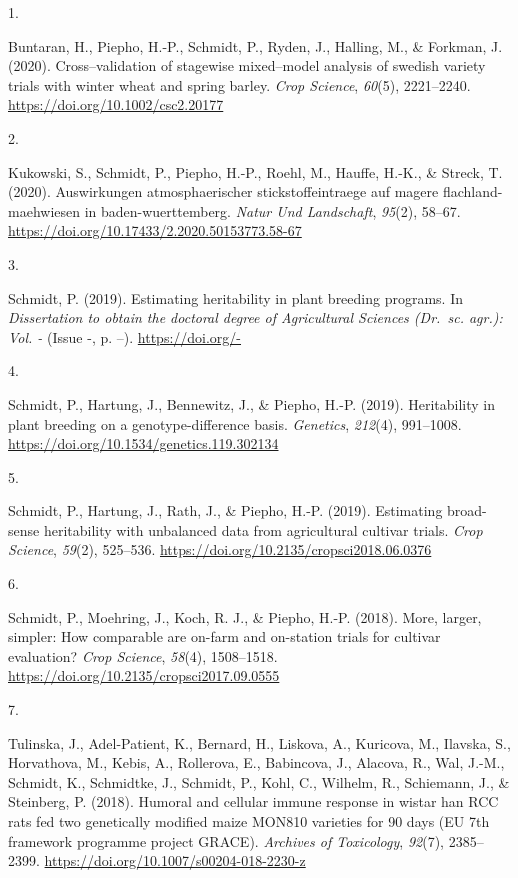\documentclass[11pt, a4paper]{awesome-cv}
\newlength{\csllabelwidth}
\newcommand{\CSLLeftMargin}[1]{\parbox[t]{\csllabelwidth}{#1}}
\newcommand{\CSLRightInline}[1]{\parbox[t]{\linewidth - \csllabelwidth}{#1}}
\begin{document}
\footnotesize

\hypertarget{bibliography}{}
\leavevmode\hypertarget{ref-Buntaran2020}{}%
\CSLLeftMargin{1. }
\CSLRightInline{Buntaran, H., Piepho, H.-P., Schmidt, P., Ryden, J.,
Halling, M., \& Forkman, J. (2020). Cross--validation of stagewise
mixed--model analysis of swedish variety trials with winter wheat and
spring barley. \emph{Crop Science}, \emph{60}(5), 2221--2240.
\url{https://doi.org/10.1002/csc2.20177}}

\leavevmode\hypertarget{ref-Kukowski2020}{}%
\CSLLeftMargin{2. }
\CSLRightInline{Kukowski, S., Schmidt, P., Piepho, H.-P., Roehl, M.,
Hauffe, H.-K., \& Streck, T. (2020). Auswirkungen atmosphaerischer
stickstoffeintraege auf magere flachland-maehwiesen in
baden-wuerttemberg. \emph{Natur Und Landschaft}, \emph{95}(2), 58--67.
\url{https://doi.org/10.17433/2.2020.50153773.58-67}}

\leavevmode\hypertarget{ref-Schmidt2019}{}%
\CSLLeftMargin{3. }
\CSLRightInline{Schmidt, P. (2019). Estimating heritability in plant
breeding programs. In \emph{Dissertation to obtain the doctoral degree
of Agricultural Sciences (Dr.~sc. agr.): Vol. -} (Issue -, p. --).
\url{https://doi.org/-}}

\leavevmode\hypertarget{ref-Schmidt2019b}{}%
\CSLLeftMargin{4. }
\CSLRightInline{Schmidt, P., Hartung, J., Bennewitz, J., \& Piepho,
H.-P. (2019). Heritability in plant breeding on a genotype-difference
basis. \emph{Genetics}, \emph{212}(4), 991--1008.
\url{https://doi.org/10.1534/genetics.119.302134}}

\leavevmode\hypertarget{ref-Schmidt2019c}{}%
\CSLLeftMargin{5. }
\CSLRightInline{Schmidt, P., Hartung, J., Rath, J., \& Piepho, H.-P.
(2019). Estimating broad-sense heritability with unbalanced data from
agricultural cultivar trials. \emph{Crop Science}, \emph{59}(2),
525--536. \url{https://doi.org/10.2135/cropsci2018.06.0376}}

\leavevmode\hypertarget{ref-Schmidt2018}{}%
\CSLLeftMargin{6. }
\CSLRightInline{Schmidt, P., Moehring, J., Koch, R. J., \& Piepho, H.-P.
(2018). More, larger, simpler: How comparable are on-farm and on-station
trials for cultivar evaluation? \emph{Crop Science}, \emph{58}(4),
1508--1518. \url{https://doi.org/10.2135/cropsci2017.09.0555}}

\leavevmode\hypertarget{ref-Tulinska2018}{}%
\CSLLeftMargin{7. }
\CSLRightInline{Tulinska, J., Adel-Patient, K., Bernard, H., Liskova,
A., Kuricova, M., Ilavska, S., Horvathova, M., Kebis, A., Rollerova, E.,
Babincova, J., Alacova, R., Wal, J.-M., Schmidt, K., Schmidtke, J.,
Schmidt, P., Kohl, C., Wilhelm, R., Schiemann, J., \& Steinberg, P.
(2018). Humoral and cellular immune response in wistar han RCC rats fed
two genetically modified maize MON810 varieties for 90 days (EU 7th
framework programme project GRACE). \emph{Archives of Toxicology},
\emph{92}(7), 2385--2399.
\url{https://doi.org/10.1007/s00204-018-2230-z}}
\end{document}

